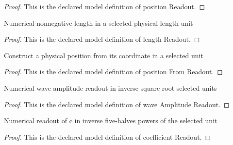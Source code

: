 \begin{proof}
  This is the declared model definition of position Readout.
\end{proof}
\begin{definition}
  \label{def:physics:phyx-mini-0550:phyxminiproblems-problemphyxmini0550-lengthreadout}
  Numerical nonnegative length in a selected physical length unit
\end{definition}
\begin{proof}
  This is the declared model definition of length Readout.
\end{proof}
\begin{definition}
  \label{def:physics:phyx-mini-0550:phyxminiproblems-problemphyxmini0550-positionfromreadout}
  Construct a physical position from its coordinate in a selected unit
\end{definition}
\begin{proof}
  This is the declared model definition of position From Readout.
\end{proof}
\begin{definition}
  \label{def:physics:phyx-mini-0550:phyxminiproblems-problemphyxmini0550-waveamplitudereadout}
  Numerical wave-amplitude readout in inverse square-root selected units
\end{definition}
\begin{proof}
  This is the declared model definition of wave Amplitude Readout.
\end{proof}
\begin{definition}
  \label{def:physics:phyx-mini-0550:phyxminiproblems-problemphyxmini0550-coefficientreadout}
  Numerical readout of c in inverse five-halves powers of the selected unit
\end{definition}
\begin{proof}
  This is the declared model definition of coefficient Readout.
\end{proof}
